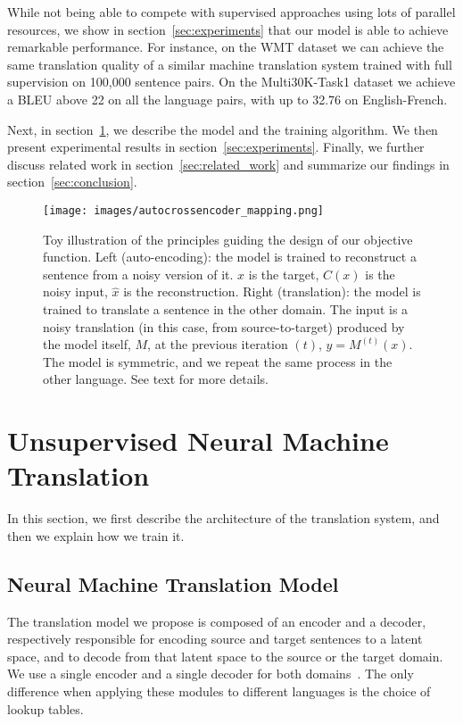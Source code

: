 \documentclass{article} \usepackage{iclr2018_conference,times}
\begin{document}
While not being able to compete with supervised approaches using lots of parallel resources, we show in section~\ref{sec:experiments} that our model is able to achieve remarkable performance. 
For instance, on the WMT dataset we can achieve the same translation quality of a similar machine translation system trained with full supervision on 100,000 sentence pairs. On the Multi30K-Task1 dataset we achieve a BLEU above 22 on all the language pairs, with up to 32.76 on English-French.

Next, in section~\ref{sec:model}, we describe the model and the training algorithm. We then present experimental results in section~\ref{sec:experiments}. Finally, we further discuss related work in section~\ref{sec:related_work} and summarize our findings in section~\ref{sec:conclusion}.

\begin{figure}[!t]
\begin{center}
\texttt{[image: images/autocrossencoder\_mapping.png]}
\end{center}
\caption{Toy illustration of the principles guiding the design of our objective function. Left (auto-encoding): the model is trained to reconstruct a sentence from a noisy version of it. $x$ is the target, $C(x)$ is the noisy input, $\hat{x}$ is the reconstruction.
 Right (translation): the model is trained to translate a sentence in the other domain. The input is a noisy translation (in this case, from  source-to-target) produced by the model itself, $M$, at the previous iteration $(t)$, $y=M^{(t)}(x)$. The model is symmetric, and we repeat the same process in the other language.  See text for more details.}
\label{fig:model_outline2}
\end{figure}

  \section{Unsupervised Neural Machine Translation}
\label{sec:model}
In this section, we first describe the architecture of the translation system, and then we explain how we train it.

\subsection{Neural Machine Translation Model}

The translation model we propose is composed of an encoder and a decoder, respectively responsible for encoding source and target sentences to a latent space, and to decode from that latent space to the source or the target domain. We use a single encoder and a single decoder for both domains~\citep{gmt17}. The only difference when applying these modules to different languages is the choice of lookup tables.
\end{document}
